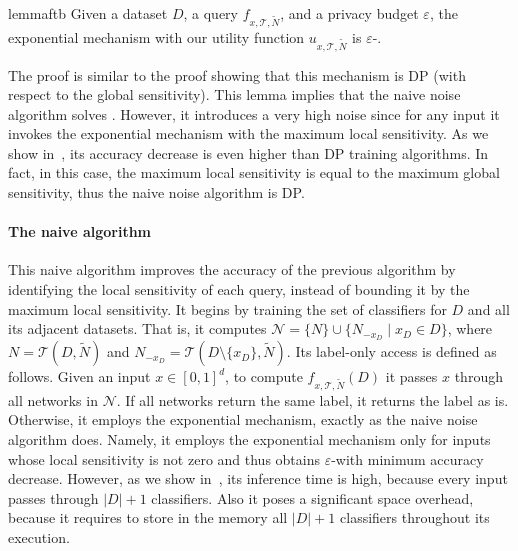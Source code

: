 \begin{restatable}[]{lemma}{ftb}
\label{lemma::exponential_mechanism}
Given a dataset $D$, a query $f_{x,\mathcal{T},\widetilde{N}}$, and a privacy budget $\varepsilon$, the exponential mechanism with our utility function $u_{x,\mathcal{T},\widetilde{N}}$ 
is $\varepsilon$-\propi.
\end{restatable}
The proof  is similar to the proof showing that this mechanism is DP (with respect to the global sensitivity).
  This lemma implies that the naive noise algorithm solves .
However, it introduces a very high noise since for any input it invokes the exponential mechanism with the maximum local sensitivity. As we show in~, its accuracy decrease is even higher than DP training algorithms.
In fact, in this case, the maximum local sensitivity is equal to the maximum global sensitivity, thus the naive noise algorithm is DP. 


\paragraph{The naive \propi algorithm} This naive algorithm improves the accuracy of the previous algorithm by identifying the local sensitivity of each query, instead of bounding it by the maximum local sensitivity.  
It begins by %
training the set of classifiers for $D$ and all its adjacent datasets.
That is, it computes $\mathcal{N}=\{N\}\cup \{N_{-x_D}\mid x_D\in D \}$, where $N=\mathcal{T}(D,\widetilde{N}) $ and $N_{-x_D}=\mathcal{T}(D\setminus\{x_D\},\widetilde{N}) $.
Its label-only access is defined as follows. Given an input $x\in [0,1]^d$, to compute $f_{x,\mathcal{T},\widetilde{N}}(D)$ it passes $x$ through all networks in $\mathcal{N}$. If all networks return the same label, it returns the label as is. 
Otherwise, it employs the exponential mechanism, exactly as the naive noise algorithm does. %
Namely, it employs the exponential mechanism only for inputs whose local sensitivity is not zero and thus  
obtains $\varepsilon$-\propi with minimum accuracy decrease.
However, as we show in~, its inference time is high, 
because every input passes through $|D|+1$ classifiers.
Also it poses a significant space overhead, because it requires to store in the memory all $|D|+1$ classifiers throughout its execution.


